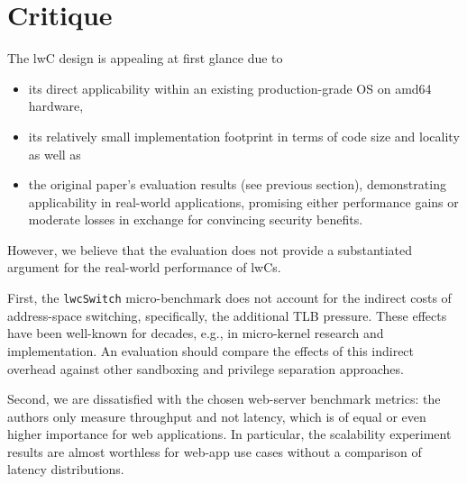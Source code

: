 \documentclass[10pt,twocolumn,a4paper]{article}
\begin{document}
\section{Critique}\label{eval:crit}
The lwC design is appealing at first glance due to
\begin{itemize}[nosep]
  \item its direct applicability within an existing production-grade OS on amd64 hardware,
  \item its relatively small implementation footprint in terms of code size and locality as well as
  \item the original paper's evaluation results (see previous section), demonstrating applicability in real-world applications, promising either performance gains or moderate losses in exchange for convincing security benefits.
\end{itemize}
However, we believe that the evaluation does not provide a substantiated argument for the real-world performance of lwCs.

First, the \lstinline{lwcSwitch} micro-benchmark does not account for the indirect costs of address-space switching, specifically, the additional TLB pressure.
These effects have been well-known for decades, e.g., in micro-kernel research  and implementation. \cite{liedtke1997achievedipcperformance} 
An evaluation should compare the effects of this indirect overhead against other sandboxing and privilege separation approaches.

Second, we are dissatisfied with the chosen web-server benchmark metrics:
the authors only measure throughput and not latency, which is of equal or even higher importance for web applications.
In particular, the scalability experiment results are almost worthless for web-app use cases without a comparison of latency distributions.
\end{document}
